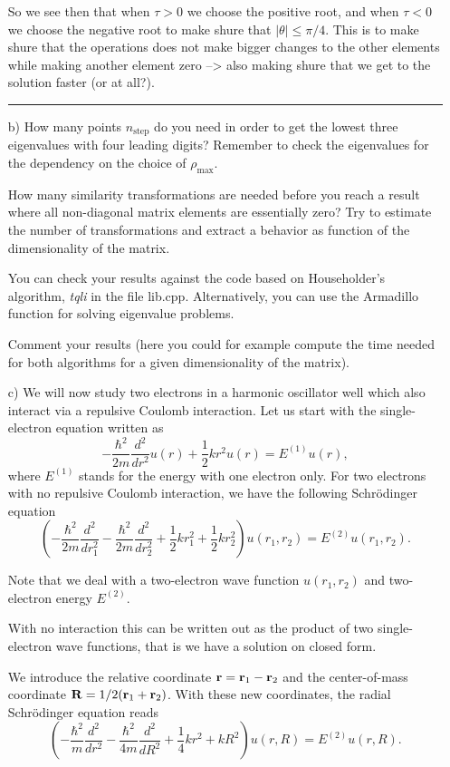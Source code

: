 \documentclass[11pt,a4wide]{article}
\begin{document}
\begin{enumerate}
So we see then that when $\tau > 0$ we choose the positive root, and when $\tau< 0$ we choose the negative root to make shure that $|\theta| \leq \pi /4 $. This is to make shure that the operations does not make bigger changes to the other elements while making another element zero --> also making shure that we get to the solution faster (or at all?).



\noindent\rule{\textwidth}{1pt}


\item[b)]
How many points $n_{\mathrm{step}}$
do you need in order to get the lowest three eigenvalues 
with four leading digits?  
Remember to check the eigenvalues for 
the dependency on the choice of $\rho_{\mathrm{max}}$.

How many similarity transformations are needed before you reach a 
result where all non-diagonal matrix elements are essentially zero?
Try to estimate the number of transformations and extract a behavior as function
of the dimensionality of the matrix.

You can check your results against the code based
on Householder's algorithm, {\em tqli} in the file lib.cpp. Alternatively, you can use the Armadillo function for solving 
eigenvalue problems. 

Comment your results (here you could for example compute the time needed for 
both algorithms for a given dimensionality of the matrix).  

 
\item[c)] We will now study two electrons in a harmonic oscillator well which
also interact via a repulsive Coulomb interaction.
Let us start with the single-electron equation written as
\[
  -\frac{\hbar^2}{2 m} \frac{d^2}{dr^2} u(r) 
       + \frac{1}{2}k r^2u(r)  = E^{(1)} u(r),
\]
where $E^{(1)}$ stands for the energy with one electron only.
For two electrons with no repulsive Coulomb interaction, we have the following 
Schr\"odinger equation
\[
\left(  -\frac{\hbar^2}{2 m} \frac{d^2}{dr_1^2} -\frac{\hbar^2}{2 m} \frac{d^2}{dr_2^2}+ \frac{1}{2}k r_1^2+ \frac{1}{2}k r_2^2\right)u(r_1,r_2)  = E^{(2)} u(r_1,r_2) .
\]


Note that we deal with a two-electron wave function $u(r_1,r_2)$ and 
two-electron energy $E^{(2)}$.

With no interaction this can be written out as the product of two
single-electron wave functions, that is we have a solution on closed form.

We introduce the relative coordinate ${\bf r} = {\bf r}_1-{\bf r}_2$
and the center-of-mass coordinate ${\bf R} = 1/2({\bf r}_1+{\bf r}_2)$.
With these new coordinates, the radial Schr\"odinger equation reads
\[
\left(  -\frac{\hbar^2}{m} \frac{d^2}{dr^2} -\frac{\hbar^2}{4 m} \frac{d^2}{dR^2}+ \frac{1}{4} k r^2+  kR^2\right)u(r,R)  = E^{(2)} u(r,R).
\]


\end{enumerate}
\end{document}
